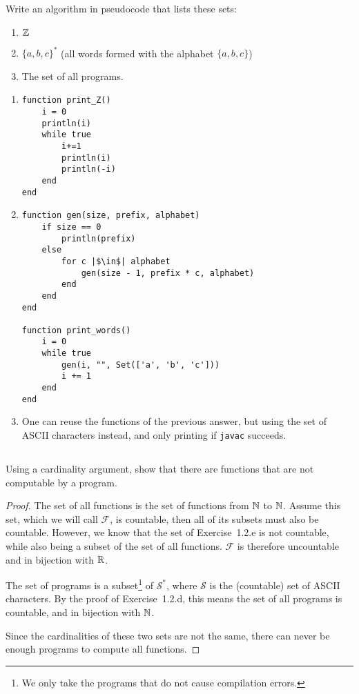 \subsection{} %
Write an algorithm in pseudocode that lists these sets:
\begin{enumerate}
	\item \(\mathbb{Z}\)
	\item \(\{a, b, c\}^*\)
	(all words formed with the alphabet \(\{a, b, c\}\))
	\item The set of all \java{} programs.
\end{enumerate}

\begin{solution}
\begin{enumerate}
\item
\begin{verbatim}
function print_Z()
	i = 0
	println(i)
	while true
		i+=1
		println(i)
		println(-i)
	end
end
\end{verbatim}
\item
\begin{verbatim}
function gen(size, prefix, alphabet)
	if size == 0
		println(prefix)
	else
		for c |$\in$| alphabet
			gen(size - 1, prefix * c, alphabet)
		end
	end
end

function print_words()
	i = 0
	while true
		gen(i, "", Set(['a', 'b', 'c']))
		i += 1
	end
end
\end{verbatim}
\item One can reuse the functions of the previous answer,
but using the set of ASCII characters instead,
and only printing if \texttt{javac} succeeds.
\end{enumerate}
\end{solution}

\subsection{} %
Using a cardinality argument,
show that there are functions that are not computable by a \java{} program.

\begin{solution}
\begin{proof}
	The set of all functions is the set of functions from \(\mathbb{N}\) to \(\mathbb{N}\).
	Assume this set, which we will call \(\mathcal{F}\), is countable,
	then all of its subsets must also be countable.
	However, we know that the set of Exercise~1.2.e is not countable,
	while also being a subset of the set of all functions.
	\(\mathcal{F}\) is therefore uncountable and in bijection with \(\mathbb{R}\).

	The set of \java{} programs is a subset\footnote{We only take
	the programs that do not cause compilation errors.}
	of \(\mathcal{S}^*\),
	where \(\mathcal{S}\) is the (countable) set of ASCII characters.
	By the proof of Exercise~1.2.d,
	this means the set of all \java{} programs is countable,
	and in bijection with \(\mathbb{N}\).

	Since the cardinalities of these two sets are not the same,
	there can never be enough \java{} programs to compute all functions.
\end{proof}
\end{solution}

